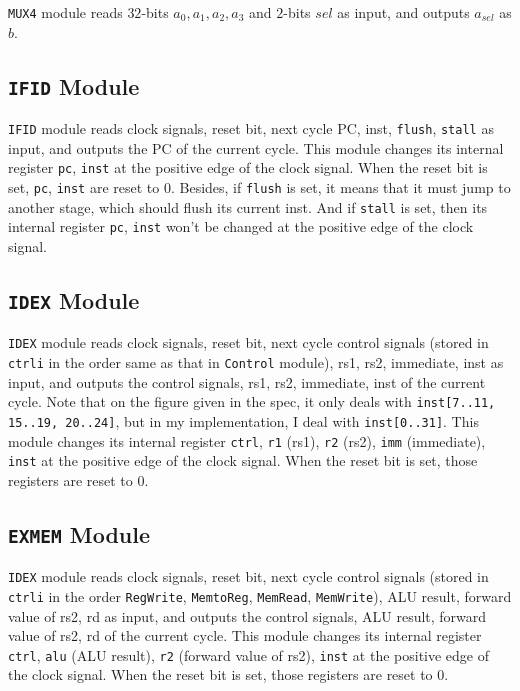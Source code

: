 \texttt{MUX4} module reads $32$-bits $a_0, a_1, a_2, a_3$ and $2$-bits $sel$ as input, and outputs $a_{sel}$ as $b$.

\subsection{\texttt{IFID} Module}

\texttt{IFID} module reads clock signals, reset bit, next cycle PC, inst, \texttt{flush}, \texttt{stall} as input, and outputs the PC of the current cycle. This module changes its internal register \texttt{pc}, \texttt{inst} at the positive edge of the clock signal. When the reset bit is set, \texttt{pc}, \texttt{inst} are reset to $0$. Besides, if \texttt{flush} is set, it means that it must jump to another stage, which should flush its current inst. And if \texttt{stall} is set, then its internal register \texttt{pc}, \texttt{inst} won't be changed at the positive edge of the clock signal.

\subsection{\texttt{IDEX} Module}

\texttt{IDEX} module reads clock signals, reset bit, next cycle control signals (stored in \texttt{ctrli} in the order same as that in \texttt{Control} module), rs1, rs2, immediate, inst as input, and outputs the control signals, rs1, rs2, immediate, inst of the current cycle. Note that on the figure given in the spec, it only deals with \texttt{inst[7..11, 15..19, 20..24]}, but in my implementation, I deal with \texttt{inst[0..31]}. This module changes its internal register \texttt{ctrl}, \texttt{r1} (rs1), \texttt{r2} (rs2), \texttt{imm} (immediate), \texttt{inst} at the positive edge of the clock signal. When the reset bit is set, those registers are reset to $0$.

\subsection{\texttt{EXMEM} Module}

\texttt{IDEX} module reads clock signals, reset bit, next cycle control signals (stored in \texttt{ctrli} in the order \texttt{RegWrite}, \texttt{MemtoReg}, \texttt{MemRead}, \texttt{MemWrite}), ALU result, forward value of rs2, rd as input, and outputs the control signals, ALU result, forward value of rs2, rd of the current cycle. This module changes its internal register \texttt{ctrl}, \texttt{alu} (ALU result), \texttt{r2} (forward value of rs2), \texttt{inst} at the positive edge of the clock signal. When the reset bit is set, those registers are reset to $0$.

